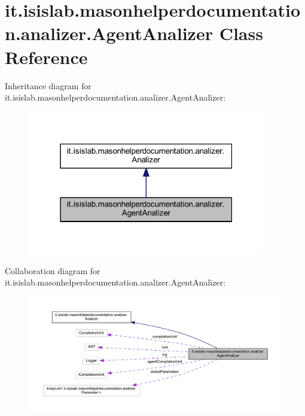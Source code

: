\hypertarget{classit_1_1isislab_1_1masonhelperdocumentation_1_1analizer_1_1_agent_analizer}{\section{it.\-isislab.\-masonhelperdocumentation.\-analizer.\-Agent\-Analizer Class Reference}
\label{classit_1_1isislab_1_1masonhelperdocumentation_1_1analizer_1_1_agent_analizer}
}


Inheritance diagram for it.\-isislab.\-masonhelperdocumentation.\-analizer.\-Agent\-Analizer\-:\nopagebreak
\begin{figure}[H]
\begin{center}
\leavevmode
\includegraphics[width=295pt]{classit_1_1isislab_1_1masonhelperdocumentation_1_1analizer_1_1_agent_analizer__inherit__graph}
\end{center}
\end{figure}


Collaboration diagram for it.\-isislab.\-masonhelperdocumentation.\-analizer.\-Agent\-Analizer\-:\nopagebreak
\begin{figure}[H]
\begin{center}
\leavevmode
\includegraphics[width=350pt]{classit_1_1isislab_1_1masonhelperdocumentation_1_1analizer_1_1_agent_analizer__coll__graph}
\end{center}
\end{figure}
